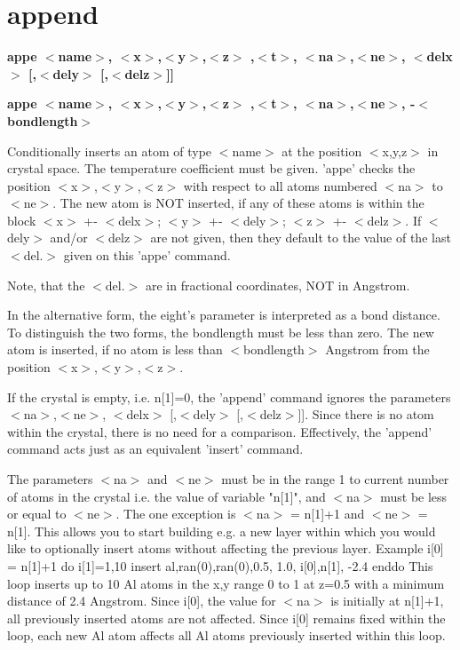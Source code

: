 \section{append}
{\bf appe $ <$name$> $, $ <$x$> $,$ <$y$> $,$ <$z$> $ ,$ <$t$> $, $ <$na$> $,$ <$ne$> $, $ <$delx$> $ [,$ <$dely$> $ [,$ <$delz$> $]] \par }
{\bf appe $ <$name$> $, $ <$x$> $,$ <$y$> $,$ <$z$> $ ,$ <$t$> $, $ <$na$> $,$ <$ne$> $, -$ <$bondlength$> $ \par }
\par
\vspace{3pt}
Conditionally inserts an atom of type $ <$name$> $ at the position $ <$x,y,z$> $ 
in crystal space. The temperature coefficient must be given. 
'appe' checks the position $ <$x$> $,$ <$y$> $,$ <$z$> $ with respect to all atoms 
numbered $ <$na$> $ to $ <$ne$> $. The new atom is NOT inserted, if any of these 
atoms is within the block $ <$x$> $ +- $ <$delx$> $; $ <$y$> $ +- $ <$dely$> $; $ <$z$> $ +- $ <$delz$> $. 
If $ <$dely$> $ and/or $ <$delz$> $ are not given, then they default to the value 
of the last $ <$del.$> $ given on this 'appe' command. 
\par
Note, that the $ <$del.$> $ are in fractional coordinates, NOT in Angstrom. 
\par
In the alternative form, the eight's parameter is interpreted as 
a bond distance. To distinguish the two forms, the bondlength must 
be less than zero. The new atom is inserted, if no atom is less than 
$ <$bondlength$> $ Angstrom from the position $ <$x$> $,$ <$y$> $,$ <$z$> $. 
\par
If the crystal is empty, i.e. n[1]=0, the 'append' command ignores the 
parameters $ <$na$> $,$ <$ne$> $, $ <$delx$> $ [,$ <$dely$> $ [,$ <$delz$> $]]. Since there is no 
atom within the crystal, there is no need for a comparison. Effectively, 
the 'append' command acts just as an equivalent 'insert' command. 
\par
The parameters $ <$na$> $ and $ <$ne$> $ must be in the range 1 to current 
number of atoms in the crystal i.e. the value of variable "n[1]", 
and $ <$na$> $ must be less or equal to $ <$ne$> $. 
The one exception is $ <$na$> $ = n[1]+1 and $ <$ne$> $ = n[1]. This allows you 
to start building e.g. a new layer within which you would like to 
optionally insert atoms without affecting the previous layer. 
Example 
i[0] = n[1]+1 
do i[1]=1,10 
  insert  al,ran(0),ran(0),0.5, 1.0, i[0],n[1], -2.4 
enddo 
This loop inserts up to 10 Al atoms in the x,y range 0 to 1 at 
z=0.5 with a minimum distance of 2.4 Angstrom. Since i[0], the 
value for $ <$na$> $ is initially at n[1]+1, all previously inserted 
atoms are not affected. Since i[0] remains fixed within the loop, 
each new Al atom affects all Al atoms previously inserted within 
this loop. 
